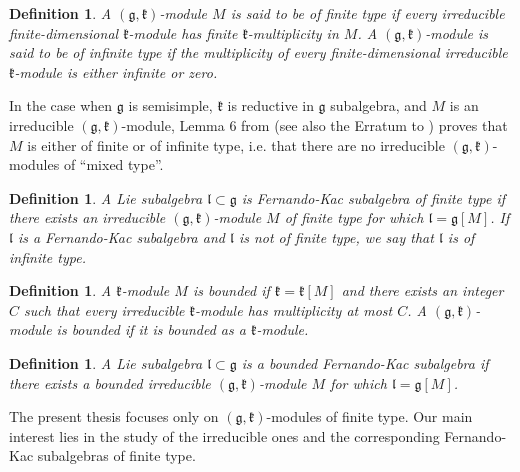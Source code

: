 \documentclass[12pt]{report}
\newtheorem{defi}[theo]{Definition}
\newcommand{\kk}{\mathfrak{k}}
\newcommand{\gG}{\mathfrak{g}}
\newcommand{\lL}{\mathfrak{l}}
\begin{document}
\begin{defi}\label{defgkmft}
A $(\gG,\kk)$-module $M$ is said to be of finite type if every irreducible finite-dimensional $\kk$-module has finite $\kk$-multiplicity in $M$. A $(\gG,\kk)$-module is said to be of infinite type if the multiplicity of every finite-dimensional irreducible $\kk$-module is either infinite or zero.
\end{defi}
In the case when $\gG$ is semisimple, $\kk$ is reductive in $\gG$ subalgebra, and $M$ is an irreducible $(\gG,\kk)$-module, Lemma 6 from \cite{PS:GenHarishChandra} (see also the Erratum to \cite{PS:GenHarishChandra}) proves that $M$ is either of finite or of infinite type, i.e. that there are no irreducible $(\gG,\kk)$-modules of ``mixed type''.
\begin{defi}\label{defFKft}
A Lie subalgebra $\lL\subset\gG$ is Fernando-Kac subalgebra of finite type if there exists an irreducible $(\gG,\kk)$-module $M$ of finite type for which $\lL=\gG[M]$. If $\lL$ is a Fernando-Kac subalgebra and $\lL$ is not of finite type, we say that $\lL$ is of infinite type.
\end{defi}
\begin{defi}\label{defB}
A $\kk$-module $M$ is bounded  if $\kk=\kk[M]$ and there exists an integer $C$ such that every irreducible $\kk$-module has multiplicity at most $C$. A $(\gG,\kk)$-module is bounded if it is bounded as a $\kk$-module. 
\end{defi}
\begin{defi}\label{defFKB}
A Lie subalgebra $\lL\subset\gG$ is a bounded Fernando-Kac subalgebra if there exists a bounded irreducible $(\gG,\kk)$-module $M$ for which $\lL=\gG[M]$. 
\end{defi}

The present thesis focuses only on $(\gG, \kk)$-modules of finite type. Our main interest lies in the study of the irreducible ones and the corresponding Fernando-Kac subalgebras of finite type. 
\end{document}
